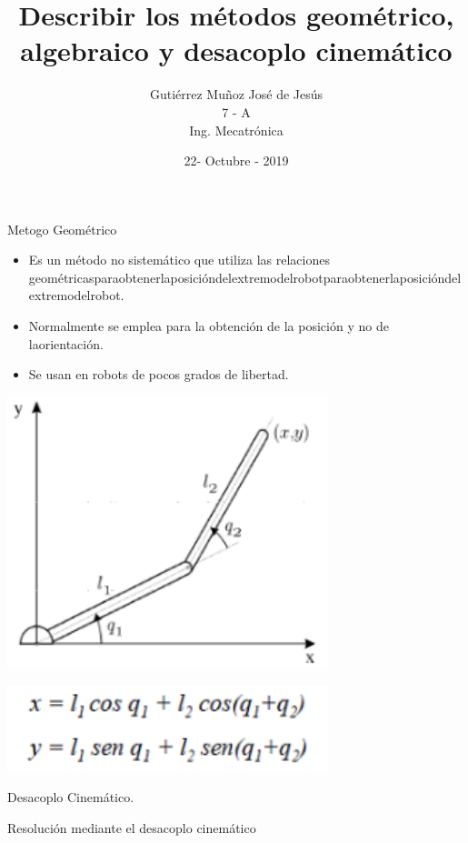 \documentclass[a4paper,10pt]{article}
\title{Describir los métodos geométrico, algebraico y desacoplo cinemático}
\author{Gutiérrez Muñoz José de Jesús \\ 7 - A \\ Ing. Mecatrónica}
\date{22- Octubre - 2019}
\begin{document}
\maketitle
\centering Metogo Geométrico

\begin{itemize}
\item Es un método no sistemático que utiliza las relaciones geométricasparaobtenerlaposicióndelextremodelrobotparaobtenerlaposicióndelextremodelrobot.
\item Normalmente se emplea para la obtención de la posición y no de laorientación.
\item Se usan en robots de pocos grados de libertad.
\end{itemize}

\begin{center}
\includegraphics[width=0.7\textwidth]{imagen1.png}
\end{center}

\begin{center}
\includegraphics[width=0.7\textwidth]{Imagen.png}
\end{center}

\pagebreak

\centering Desacoplo Cinemático.

\centering Resolución mediante el desacoplo cinemático 
\end{document}
